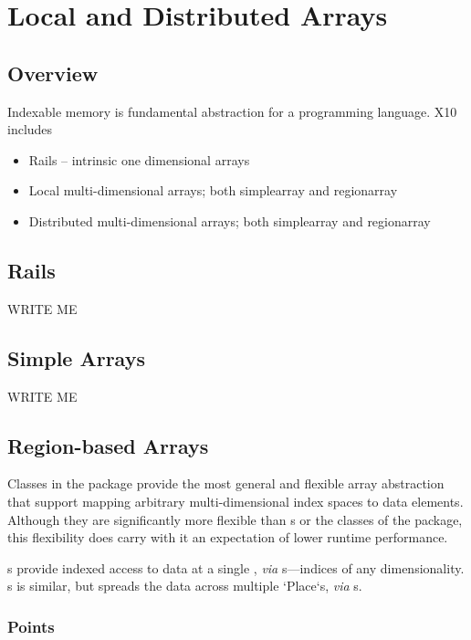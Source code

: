 \chapter{Local and Distributed Arrays}\label{XtenArrays}

\section{Overview}

Indexable memory is fundamental abstraction for a programming
language. X10 includes
\begin{itemize}
\item Rails -- intrinsic one dimensional arrays
\item Local multi-dimensional arrays; both simplearray and regionarray
\item Distributed multi-dimensional arrays; both simplearray and regionarray
\end{itemize}

\section{Rails}

WRITE ME

\section{Simple Arrays}

WRITE ME

\section{Region-based Arrays}

Classes in the  package provide the most general and 
flexible array abstraction that support mapping arbitrary multi-dimensional
index spaces to data elements. Although they are significantly more
flexible than s or the classes of the 
package, this flexibility does carry with it an expectation of lower
runtime performance. 

s provide indexed access to data at a single , {\em via}
s---indices of any dimensionality. s is similar, but
spreads the data across multiple \xcd`Place`s, {\em via} s.  

\subsection{Points}\label{point-syntax}


